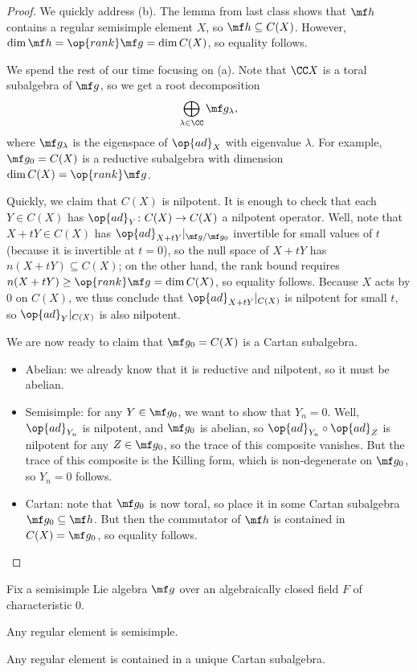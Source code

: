 \documentclass[../notes.tex]{subfiles}
\begin{document}
\begin{proof}
	We quickly address (b). The lemma from last class shows that $\mf h$ contains a regular semisimple element $X$, so $\mf h\subseteq C(X)$. However, $\dim\mf h=\op{rank}\mf g=\dim C(X)$, so equality follows.

	We spend the rest of our time focusing on (a). Note that $\CC X$ is a toral subalgebra of $\mf g$, so we get a root decomposition
	\[\bigoplus_{\lambda\in\CC}\mf g_\lambda,\]
	where $\mf g_\lambda$ is the eigenspace of $\op{ad}_X$ with eigenvalue $\lambda$. For example, $\mf g_0=C(X)$ is a reductive subalgebra with dimension $\dim C(X)=\op{rank}\mf g$.

	Quickly, we claim that $C(X)$ is nilpotent. It is enough to check that each $Y\in C(X)$ has $\op{ad}_Y\colon C(X)\to C(X)$ a nilpotent operator. Well, note that $X+tY\in C(X)$ has ${\op{ad}_{X+tY}}|_{\mf g/\mf g_0}$ invertible for small values of $t$ (because it is invertible at $t=0$), so the null space of $X+tY$ has $n(X+tY)\subseteq C(X)$; on the other hand, the rank bound requires $n(X+tY)\ge\op{rank}\mf g=\dim C(X)$, so equality follows. Because $X$ acts by $0$ on $C(X)$, we thus conclude that ${\op{ad}_{X+tY}}|_{C(X)}$ is nilpotent for small $t$, so ${\op{ad}_Y}|_{C(X)}$ is also nilpotent.

	We are now ready to claim that $\mf g_0=C(X)$ is a Cartan subalgebra.
	\begin{itemize}
		\item Abelian: we already know that it is reductive and nilpotent, so it must be abelian.
		\item Semisimple: for any $Y\in\mf g_0$, we want to show that $Y_n=0$. Well, $\op{ad}_{Y_n}$ is nilpotent, and $\mf g_0$ is abelian, so ${\op{ad}_{Y_n}}\circ\op{ad}_Z$ is nilpotent for any $Z\in\mf g_0$, so the trace of this composite vanishes. But the trace of this composite is the Killing form, which is non-degenerate on $\mf g_0$, so $Y_n=0$ follows.
		\item Cartan: note that $\mf g_0$ is now toral, so place it in some Cartan subalgebra $\mf g_0\subseteq\mf h$. But then the commutator of $\mf h$ is contained in $C(X)=\mf g_0$, so equality follows.
		\qedhere
	\end{itemize}
\end{proof}
\begin{corollary}
	Fix a semisimple Lie algebra $\mf g$ over an algebraically closed field $F$ of characteristic $0$.
	\begin{listalph}
		\item Any regular element is semisimple.
		\item Any regular element is contained in a unique Cartan subalgebra.
	\end{listalph}
\end{corollary}
\end{document}
